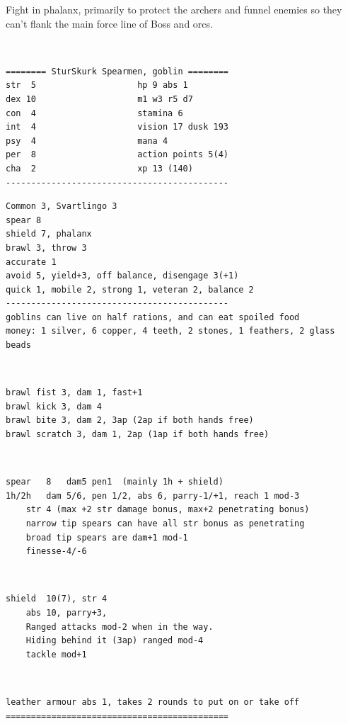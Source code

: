 Fight in phalanx, primarily to protect the archers and funnel enemies so they can't flank the main force line of Boss and orcs.

\

\goodbreak \small \begin{samepage} \begin{verbatim}
======== SturSkurk Spearmen, goblin ========
str  5                    hp 9 abs 1
dex 10                    m1 w3 r5 d7
con  4                    stamina 6
int  4                    vision 17 dusk 193
psy  4                    mana 4
per  8                    action points 5(4)
cha  2                    xp 13 (140)
--------------------------------------------
\end{verbatim} \end{samepage} \goodbreak \begin{samepage} \begin{verbatim}
Common 3, Svartlingo 3
spear 8
shield 7, phalanx
brawl 3, throw 3
accurate 1
avoid 5, yield+3, off balance, disengage 3(+1)
quick 1, mobile 2, strong 1, veteran 2, balance 2
--------------------------------------------
goblins can live on half rations, and can eat spoiled food
money: 1 silver, 6 copper, 4 teeth, 2 stones, 1 feathers, 2 glass beads
\end{verbatim} \begin{samepage}   \   \goodbreak \end{samepage} \begin{verbatim}
brawl fist 3, dam 1, fast+1
brawl kick 3, dam 4 
brawl bite 3, dam 2, 3ap (2ap if both hands free)
brawl scratch 3, dam 1, 2ap (1ap if both hands free)
\end{verbatim} \begin{samepage}   \   \goodbreak \end{samepage} \begin{verbatim}
spear   8   dam5 pen1  (mainly 1h + shield)
1h/2h   dam 5/6, pen 1/2, abs 6, parry-1/+1, reach 1 mod-3
    str 4 (max +2 str damage bonus, max+2 penetrating bonus)
    narrow tip spears can have all str bonus as penetrating
    broad tip spears are dam+1 mod-1
    finesse-4/-6
\end{verbatim} \begin{samepage}   \   \goodbreak \end{samepage} \begin{verbatim}
shield  10(7), str 4
    abs 10, parry+3,
    Ranged attacks mod-2 when in the way.
    Hiding behind it (3ap) ranged mod-4
    tackle mod+1
\end{verbatim} \begin{samepage}   \   \goodbreak \end{samepage} \begin{verbatim}
leather armour abs 1, takes 2 rounds to put on or take off
============================================
\end{verbatim} \end{samepage} \normalsize

